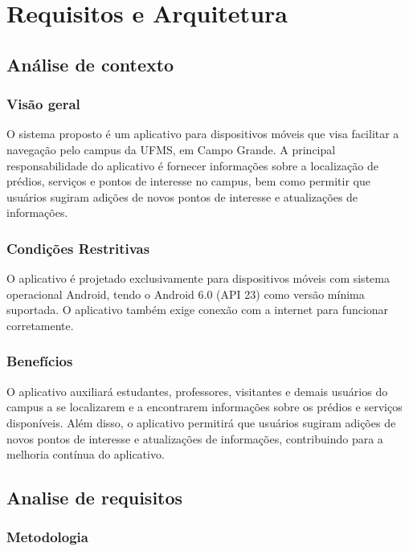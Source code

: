 \section{Requisitos e Arquitetura}

\subsection{Análise de contexto}

\subsubsection{Visão geral}

    O sistema proposto é um aplicativo para dispositivos móveis que visa facilitar a navegação pelo campus da UFMS, em Campo Grande.  A principal responsabilidade do aplicativo é fornecer informações sobre a localização de prédios, serviços e pontos de interesse no campus, bem como permitir que usuários sugiram adições de novos pontos de interesse e atualizações de informações.

\subsubsection{Condições Restritivas}

    O aplicativo é projetado exclusivamente para dispositivos móveis com sistema operacional Android, tendo o Android 6.0 (API 23) como versão mínima suportada. O aplicativo também exige conexão com a internet para funcionar corretamente.

\subsubsection{Benefícios}

    O aplicativo auxiliará estudantes, professores, visitantes e demais usuários do campus a se localizarem e a encontrarem informações sobre os prédios e serviços disponíveis. Além disso, o aplicativo permitirá que usuários sugiram adições de novos pontos de interesse e atualizações de informações, contribuindo para a melhoria contínua do aplicativo.

\subsection{Analise de requisitos}

\subsubsection{Metodologia}

